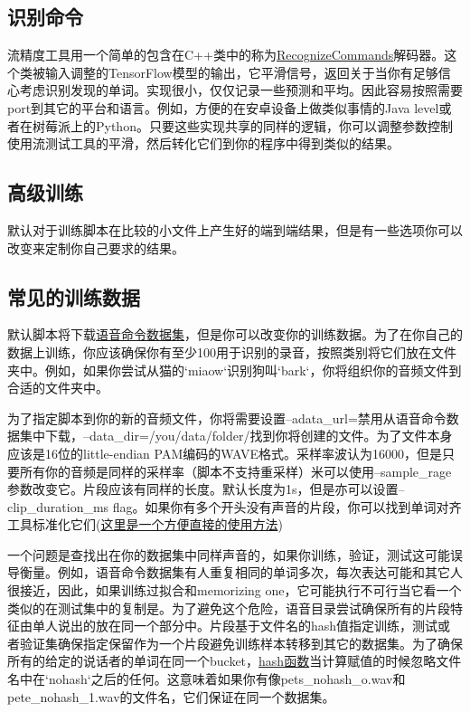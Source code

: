 \subsection{识别命令}
流精度工具用一个简单的包含在C++类中的称为\href{https://github.com/tensorflow/tensorflow/tree/master/tensorflow/examples/speech_commands/recognize_commands.h}{RecognizeCommands}解码器。这个类被输入调整的TensorFlow模型的输出，它平滑信号，返回关于当你有足够信心考虑识别发现的单词。实现很小，仅仅记录一些预测和平均。因此容易按照需要port到其它的平台和语言。例如，方便的在安卓设备上做类似事情的Java level或者在树莓派上的Python。只要这些实现共享的同样的逻辑，你可以调整参数控制使用流测试工具的平滑，然后转化它们到你的程序中得到类似的结果。
\subsection{高级训练}
默认对于训练脚本在比较的小文件上产生好的端到端结果，但是有一些选项你可以改变来定制你自己要求的结果。
\subsection{常见的训练数据}
默认脚本将下载\href{https://download.tensorflow.org/data/speech_commands_v0.01.tgz}{语音命令数据集}，但是你可以改变你的训练数据。为了在你自己的数据上训练，你应该确保你有至少100用于识别的录音，按照类别将它们放在文件夹中。例如，如果你尝试从猫的`miaow`识别狗叫`bark`，你将组织你的音频文件到合适的文件夹中。

为了指定脚本到你的新的音频文件，你将需要设置--adata\_url=禁用从语音命令数据集中下载，--data\_dir=/you/data/folder/找到你将创建的文件。为了文件本身应该是16位的little-endian PAM编码的WAVE格式。采样率波认为16000，但是只要所有你的音频是同样的采样率（脚本不支持重采样）米可以使用--sample\_rage参数改变它。片段应该有同样的长度。默认长度为1s，但是亦可以设置--clip\_duration\_ms flag。如果你有多个开头没有声音的片段，你可以找到单词对齐工具标准化它们(\href{https://petewarden.com/2017/07/17/a-quick-hack-to-align-single-word-audio-recordings/}{这里是一个方便直接的使用方法})

一个问题是查找出在你的数据集中同样声音的，如果你训练，验证，测试这可能误导衡量。例如，语音命令数据集有人重复相同的单词多次，每次表达可能和其它人很接近，因此，如果训练过拟合和memorizing one，它可能执行不可行当它看一个类似的在测试集中的复制是。为了避免这个危险，语音目录尝试确保所有的片段特征由单人说出的放在同一个部分中。片段基于文件名的hash值指定训练，测试或者验证集确保指定保留作为一个片段避免训练样本转移到其它的数据集。为了确保所有的给定的说话者的单词在同一个bucket，\href{https://github.com/tensorflow/tensorflow/tree/master/tensorflow/examples/speech_commands/input_data.py}{hash函数}当计算赋值的时候忽略文件名中在`nohash`之后的任何。这意味着如果你有像pets\_nohash\_o.wav和pete\_nohash\_1.wav的文件名，它们保证在同一个数据集。

